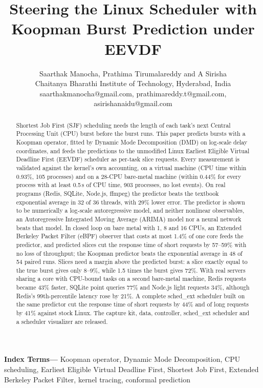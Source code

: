 \documentclass{article}
\title{Steering the Linux Scheduler with Koopman Burst Prediction under EEVDF}
\author{Saarthak Manocha, Prathima Tirumalareddy and A Sirisha\\Chaitanya Bharathi Institute of Technology, Hyderabad, India\\saarthakmanocha@gmail.com, prathimareddy.t@gmail.com, asirishanaidu@gmail.com}
\date{}
\begin{document}
\maketitle


\begin{abstract}
Shortest Job First (SJF) scheduling needs the length of each task's next Central Processing Unit (CPU) burst before the burst runs. This paper predicts bursts with a Koopman operator, fitted by Dynamic Mode Decomposition (DMD) on log-scale delay coordinates, and feeds the predictions to the unmodified Linux Earliest Eligible Virtual Deadline First (EEVDF) scheduler as per-task slice requests. Every measurement is validated against the kernel's own accounting, on a virtual machine (CPU time within 0.93\%, 105 processes) and on a 28-CPU bare-metal machine (within 0.44\% for every process with at least 0.5\,s of CPU time, 903 processes, no lost events). On real programs (Redis, SQLite, Node.js, ffmpeg) the predictor beats the textbook exponential average in 32 of 36 threads, with 29\% lower error. The predictor is shown to be numerically a log-scale autoregressive model, and neither nonlinear observables, an Autoregressive Integrated Moving Average (ARIMA) model nor a neural network beats that model. In closed loop on bare metal with 1, 8 and 16 CPUs, an Extended Berkeley Packet Filter (eBPF) observer that costs at most 1.4\% of one core feeds the predictor, and predicted slices cut the response time of short requests by 57--59\% with no loss of throughput; the Koopman predictor beats the exponential average in 48 of 54 paired runs. Slices need a margin above the predicted burst: a slice exactly equal to the true burst gives only 8--9\%, while 1.5 times the burst gives 72\%. With real servers sharing a core with CPU-bound tasks on a second bare-metal machine, Redis requests became 43\% faster, SQLite point queries 77\% and Node.js light requests 34\%, although Redis's 99th-percentile latency rose by 21\%. A complete sched\_ext scheduler built on the same predictor cut the response time of short requests by 44\% and of long requests by 41\% against stock Linux. The capture kit, data, controller, sched\_ext scheduler and a scheduler visualizer are released.
\end{abstract}

\noindent\textbf{Index Terms---}
Koopman operator, Dynamic Mode Decomposition, CPU scheduling, Earliest Eligible Virtual Deadline First, Shortest Job First, Extended Berkeley Packet Filter, kernel tracing, conformal prediction
\end{document}
